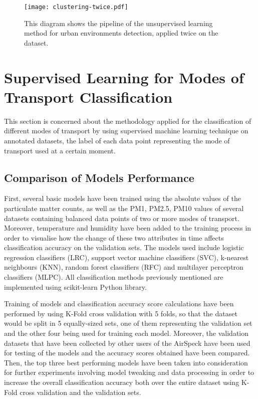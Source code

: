 \documentclass[bsc,frontabs,twoside,singlespacing,parskip,deptreport]{infthesis}     %
\begin{document}
\begin{figure}[h!]
  \center
  \texttt{[image: clustering-twice.pdf]}
  \caption{This diagram shows the pipeline of the unsupervised learning method for urban environments detection, applied twice on the dataset.}
  \label{fig:clustering-twice}
\end{figure}

\section{Supervised Learning for Modes of Transport Classification}

This section is concerned about the methodology applied for the classification of different modes of transport by using supervised machine learning technique on annotated datasets, the label of each data point representing the mode of transport used at a certain moment.

\subsection{Comparison of Models Performance}

First, several basic models have been trained using the absolute values of the particulate matter counts, as well as the PM1, PM2.5, PM10 values of several datasets containing balanced data points of two or more modes of transport. Moreover, temperature and humidity have been added to the training process in order to visualise how the change of these two attributes in time affects classification accuracy on the validation sets. The models used include logistic regression classifiers (LRC), support vector machine classifiers (SVC), k-nearest neighbours (KNN), random forest classifiers (RFC) and multilayer perceptron classifiers (MLPC). All classification methods previously mentioned are implemented using scikit-learn Python library.

Training of models and classification accuracy score calculations have been performed by using K-Fold cross validation with 5 folds, so that the dataset would be split in 5 equally-sized sets, one of them representing the validation set and the other four being used for training each model. Moreover, the validation datasets that have been collected by other users of the AirSpeck have been used for testing of the models and the accuracy scores obtained have been compared. Then, the top three best performing models have been taken into consideration for further experiments involving model tweaking and data processing in order to increase the overall classification accuracy both over the entire dataset using K-Fold cross validation and the validation sets.
\end{document}
